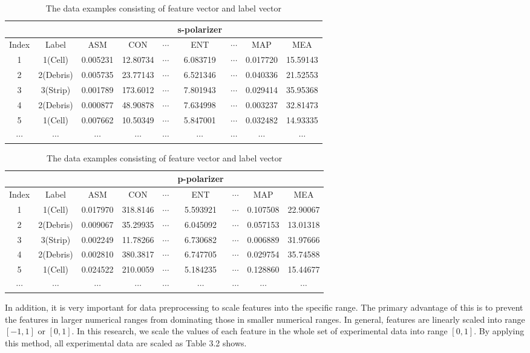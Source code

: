 \begin{table}[!h]
\renewcommand{\arraystretch}{0.5}
\begin{tabular}{||c c | c c c c c c c||}
\hline
& & & & & s-polarizer & & &\\
\hline
Index & Label & ASM & CON & $\cdots$ & ENT & $\cdots$ & MAP & MEA\\[0.7ex]
\hline\hline
1 & 1(Cell) & 0.005231 & 12.80734 & $\cdots$ & 6.083719 & $\cdots$ & 0.017720 & 15.59143 \\
2 & 2(Debris) & 0.005735 & 23.77143 & $\cdots$ & 6.521346 & $\cdots$ & 0.040336 & 21.52553 \\
3 & 3(Strip) & 0.001789 & 173.6012 & $\cdots$ & 7.801943 & $\cdots$ & 0.029414 & 35.95368 \\
4 & 2(Debris) & 0.000877 & 48.90878 & $\cdots$ & 7.634998 & $\cdots$ & 0.003237 & 32.81473 \\
5 & 1(Cell) & 0.007662 & 10.50349 & $\cdots$ & 5.847001 & $\cdots$ & 0.032482 & 14.93335 \\
$\cdots$ & $\cdots$ & $\cdots$ & $\cdots$ & $\cdots$ & $\cdots$ & $\cdots$ & $\cdots$ & $\cdots$\\
\hline
\end{tabular}
\begin{tabular}{||c c | c c c c c c c||}
\hline
& & & & & p-polarizer & & &\\
\hline
Index & Label & ASM & CON & $\cdots$ & ENT & $\cdots$ & MAP & MEA\\[0.7ex]
\hline\hline
1 & 1(Cell) & 0.017970 & 318.8146 & $\cdots$ & 5.593921 & $\cdots$ & 0.107508 & 22.90067 \\
2 & 2(Debris) & 0.009067 & 35.29935 & $\cdots$ & 6.045092 & $\cdots$ & 0.057153 & 13.01318 \\
3 & 3(Strip) & 0.002249 & 11.78266 & $\cdots$ & 6.730682 & $\cdots$ & 0.006889 & 31.97666 \\
4 & 2(Debris) & 0.002810 & 380.3817 & $\cdots$ & 6.747705 & $\cdots$ & 0.029754 & 35.74588 \\
5 & 1(Cell) & 0.024522 & 210.0059 & $\cdots$ & 5.184235 & $\cdots$ & 0.128860 & 15.44677 \\
$\cdots$ & $\cdots$ & $\cdots$ & $\cdots$ & $\cdots$ & $\cdots$ & $\cdots$ & $\cdots$ & $\cdots$\\
\hline
\end{tabular}
\caption {The data examples consisting of feature vector and label vector}
\end{table}
In addition, it is very important for data preprocessing to scale features into the specific range. The primary advantage of this is to prevent the features in larger numerical ranges from dominating those in smaller numerical ranges. In general, features are linearly scaled into range $[-1, 1]$ or $[0, 1]$. In this research, we scale the values of each feature in the whole set of experimental data into range $[0,1]$. By applying this method, all experimental data are scaled as Table 3.2 shows. 
